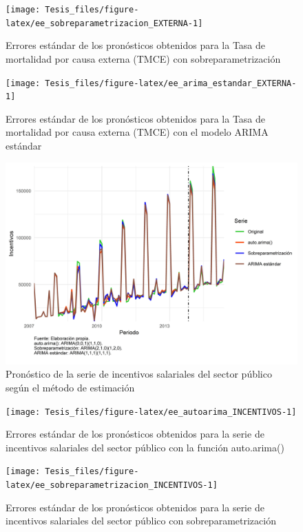 \documentclass[
]{article}
\begin{document}
\begin{figure}[H]
\texttt{[image: Tesis\_files/figure-latex/ee\_sobreparametrizacion\_EXTERNA-1]} \caption{Errores estándar de los pronósticos obtenidos para la Tasa de mortalidad por causa externa (TMCE) con sobreparametrización}\label{fig:ee_sobreparametrizacion_EXTERNA}
\end{figure}

\begin{figure}[H]
\texttt{[image: Tesis\_files/figure-latex/ee\_arima\_estandar\_EXTERNA-1]} \caption{Errores estándar de los pronósticos obtenidos para la Tasa de mortalidad por causa externa (TMCE) con el modelo ARIMA estándar}\label{fig:ee_arima_estandar_EXTERNA}
\end{figure}

\begin{figure}[H]
\includegraphics[width=1\linewidth,height=1\textheight]{Tesis_files/figure-latex/pronostico_INCENTIVOS-1} \caption{Pronóstico de la serie de incentivos salariales del sector público según el método de estimación}\label{fig:pronostico_INCENTIVOS}
\end{figure}

\begin{figure}[H]
\texttt{[image: Tesis\_files/figure-latex/ee\_autoarima\_INCENTIVOS-1]} \caption{Errores estándar de los pronósticos obtenidos para la serie de incentivos salariales del sector público con la función auto.arima()}\label{fig:ee_autoarima_INCENTIVOS}
\end{figure}

\begin{figure}[H]
\texttt{[image: Tesis\_files/figure-latex/ee\_sobreparametrizacion\_INCENTIVOS-1]} \caption{Errores estándar de los pronósticos obtenidos para la serie de incentivos salariales del sector público con sobreparametrización}\label{fig:ee_sobreparametrizacion_INCENTIVOS}
\end{figure}
\end{document}
